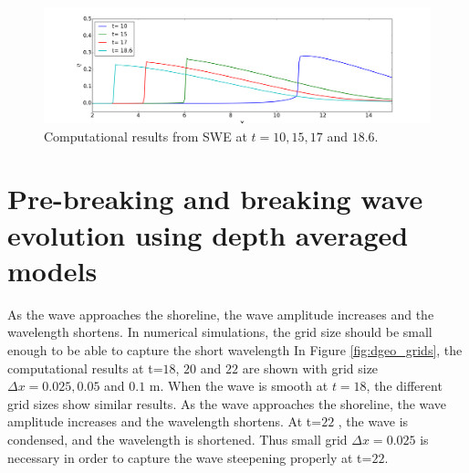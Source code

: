 \documentclass[review]{elsarticle}
\begin{document}
\begin{figure}[!htb]
\centering
\includegraphics[width=\textwidth]{_fig/sw_dx05_time_series.png}
\caption{Computational results from SWE at $t=10,15,17$ and $18.6$.}
\label{fig:sw_timeseries}
\end{figure}


\section{Pre-breaking and breaking wave evolution using depth averaged models}
\label{sec:num_breaking}

\iffalse

As the wave approaches the shoreline,
the wave amplitude increases and the wavelength shortens. 
In numerical simulations,
the grid size should be small enough 
to be able to capture the short wavelength 
In Figure \ref{fig:dgeo_grids}, 
the computational results at t=$18$, $20$ and $22$ are shown 
with grid size $\Delta x = 0.025, 0.05$ and $0.1$ m. 
When the wave is smooth at $t=18$, the different grid sizes
show similar results. 
As the wave approaches the shoreline,
the wave amplitude increases and the wavelength shortens. 
At t=$22$ , the wave is condensed,
and the wavelength is shortened.
Thus small grid $\Delta x=0.025$ is necessary 
in order to capture the wave steepening properly at t=$22$.
\end{document}
